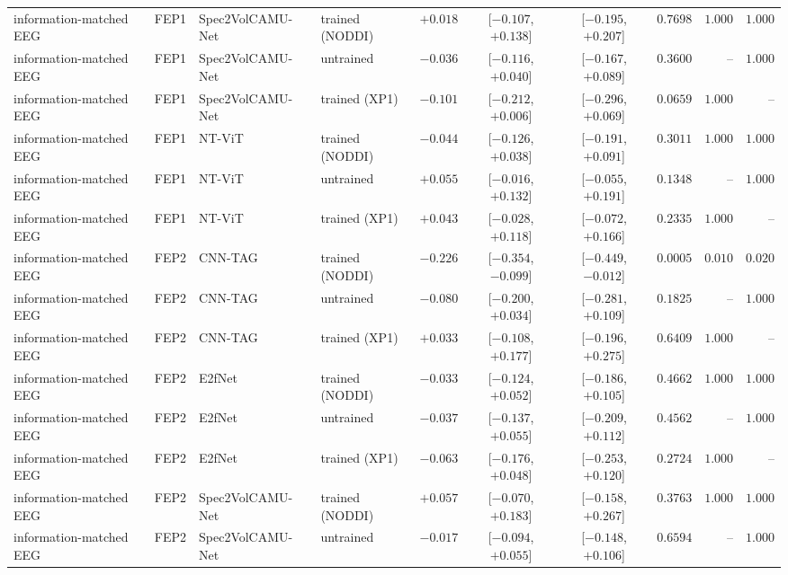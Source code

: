 \documentclass[10pt]{article}
\begin{document}
\begin{longtable}{l l l l r c c r r r}
        information-matched EEG & FEP1 & Spec2VolCAMU-Net & trained (NODDI) & $+0.018$ & [$-0.107$, $+0.138$] & [$-0.195$, $+0.207$] & $0.7698$ & $1.000$ & $1.000$ \\
        information-matched EEG & FEP1 & Spec2VolCAMU-Net & untrained & $-0.036$ & [$-0.116$, $+0.040$] & [$-0.167$, $+0.089$] & $0.3600$ & -- & $1.000$ \\
        information-matched EEG & FEP1 & Spec2VolCAMU-Net & trained (XP1) & $-0.101$ & [$-0.212$, $+0.006$] & [$-0.296$, $+0.069$] & $0.0659$ & $1.000$ & -- \\
        information-matched EEG & FEP1 & NT-ViT & trained (NODDI) & $-0.044$ & [$-0.126$, $+0.038$] & [$-0.191$, $+0.091$] & $0.3011$ & $1.000$ & $1.000$ \\
        information-matched EEG & FEP1 & NT-ViT & untrained & $+0.055$ & [$-0.016$, $+0.132$] & [$-0.055$, $+0.191$] & $0.1348$ & -- & $1.000$ \\
        information-matched EEG & FEP1 & NT-ViT & trained (XP1) & $+0.043$ & [$-0.028$, $+0.118$] & [$-0.072$, $+0.166$] & $0.2335$ & $1.000$ & -- \\
        information-matched EEG & FEP2 & CNN-TAG & trained (NODDI) & $-0.226$ & [$-0.354$, $-0.099$] & [$-0.449$, $-0.012$] & $0.0005$ & $0.010$ & $0.020$ \\
        information-matched EEG & FEP2 & CNN-TAG & untrained & $-0.080$ & [$-0.200$, $+0.034$] & [$-0.281$, $+0.109$] & $0.1825$ & -- & $1.000$ \\
        information-matched EEG & FEP2 & CNN-TAG & trained (XP1) & $+0.033$ & [$-0.108$, $+0.177$] & [$-0.196$, $+0.275$] & $0.6409$ & $1.000$ & -- \\
        information-matched EEG & FEP2 & E2fNet & trained (NODDI) & $-0.033$ & [$-0.124$, $+0.052$] & [$-0.186$, $+0.105$] & $0.4662$ & $1.000$ & $1.000$ \\
        information-matched EEG & FEP2 & E2fNet & untrained & $-0.037$ & [$-0.137$, $+0.055$] & [$-0.209$, $+0.112$] & $0.4562$ & -- & $1.000$ \\
        information-matched EEG & FEP2 & E2fNet & trained (XP1) & $-0.063$ & [$-0.176$, $+0.048$] & [$-0.253$, $+0.120$] & $0.2724$ & $1.000$ & -- \\
        information-matched EEG & FEP2 & Spec2VolCAMU-Net & trained (NODDI) & $+0.057$ & [$-0.070$, $+0.183$] & [$-0.158$, $+0.267$] & $0.3763$ & $1.000$ & $1.000$ \\
        information-matched EEG & FEP2 & Spec2VolCAMU-Net & untrained & $-0.017$ & [$-0.094$, $+0.055$] & [$-0.148$, $+0.106$] & $0.6594$ & -- & $1.000$ \\

\end{longtable}
\end{document}
